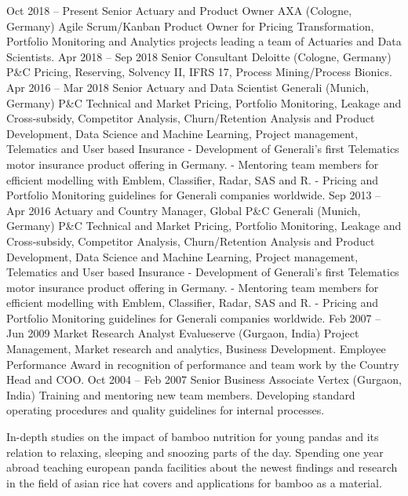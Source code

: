 \documentclass[
	a4paper,
]{fortysecondscv}
\begin{document}
\makefrontsidebar

\begin{cvtable}[3]
	\cvitem
		{Oct 2018 -- Present}
		{Senior Actuary and Product Owner}
		{AXA (Cologne, Germany)}
		{
			Agile Scrum/Kanban Product Owner for Pricing Transformation, Portfolio Monitoring and Analytics projects leading a team of Actuaries and Data Scientists.
		}
	\cvitem
		{Apr 2018 -- Sep 2018}
		{Senior Consultant}
		{Deloitte (Cologne, Germany)}
		{
			P\&C Pricing, Reserving, Solvency II, IFRS 17, Process Mining/Process Bionics.
		}
	\cvitem
		{Apr 2016 -- Mar 2018}
		{Senior Actuary and Data Scientist}
		{Generali (Munich, Germany)}
		{
			P\&C Technical and Market Pricing, Portfolio Monitoring, Leakage and Cross-subsidy, Competitor Analysis, Churn/Retention Analysis and Product Development, Data Science and Machine Learning, Project management, Telematics and User based Insurance
			- Development of Generali’s first Telematics motor insurance product offering in Germany.
			- Mentoring team members for efficient modelling with Emblem, Classifier, Radar, SAS and R.
			- Pricing and Portfolio Monitoring guidelines for Generali companies worldwide.
		}
	\cvitem
		{Sep 2013 -- Apr 2016}
		{Actuary and Country Manager, Global P\&C}
		{Generali (Munich, Germany)}
		{
			P\&C Technical and Market Pricing, Portfolio Monitoring, Leakage and Cross-subsidy, Competitor Analysis, Churn/Retention Analysis and Product Development, Data Science and Machine Learning, Project management, Telematics and User based Insurance
			- Development of Generali’s first Telematics motor insurance product offering in Germany.
			- Mentoring team members for efficient modelling with Emblem, Classifier, Radar, SAS and R.
			- Pricing and Portfolio Monitoring guidelines for Generali companies worldwide.
		}
	\cvitem
		{Feb 2007 -- Jun 2009}
		{Market Research Analyst}
		{Evalueserve (Gurgaon, India)}
		{
			Project Management, Market research and analytics, Business Development.
			Employee Performance Award in recognition of performance and team work by the Country Head and COO.
		}
	\cvitem
		{Oct 2004 -- Feb 2007}
		{Senior Business Associate}
		{Vertex (Gurgaon, India)}
		{
			Training and mentoring new team members. 
			Developing standard operating procedures and quality guidelines for internal processes.
		}
\end{cvtable}


\begin{cvtable}[1.5]
		{In-depth studies on the impact of bamboo nutrition for young pandas and
		its relation to relaxing, sleeping and snoozing parts of the day.}
		{Spending one year abroad teaching european panda facilities about the
		newest findings and research in the field of asian rice hat covers and
		applications for bamboo as a material.}
\end{cvtable}
\end{document}
